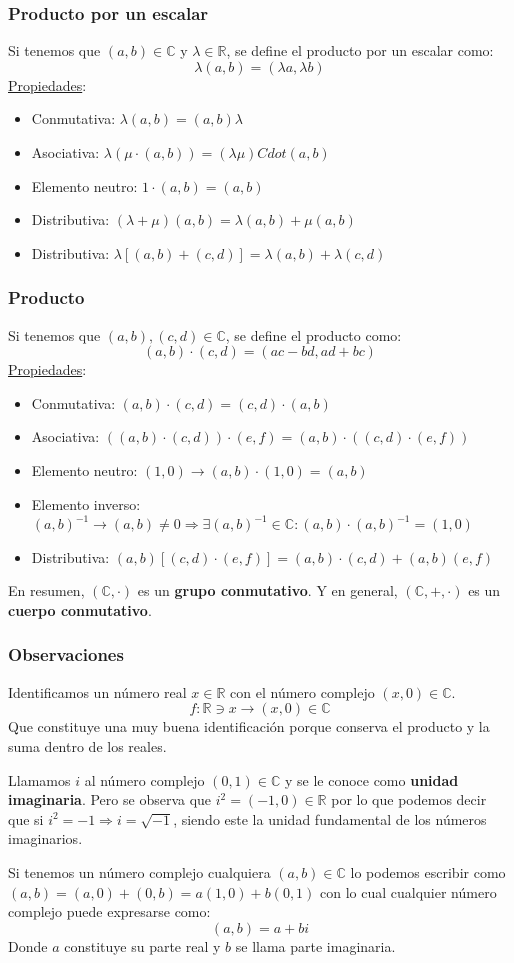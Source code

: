 \documentclass[10pt,a4paper,openright]{book}
\begin{document}
\subsubsection*{Producto por un escalar}
Si tenemos que $(a,b)\in \mathbb C$ y $\lambda\in \mathbb R$, se define el producto por un escalar como:
$$\lambda(a,b)=(\lambda a,\lambda b)$$
\underline{Propiedades}:
\begin{itemize}
\item Conmutativa: $\lambda(a,b)=(a,b)\lambda$
\item Asociativa: $\lambda(\mu \cdot (a,b))=(\lambda\mu)Cdot (a,b)$
\item Elemento neutro: $1\cdot (a,b)=(a,b)$
\item Distributiva: $(\lambda+\mu)(a,b)=\lambda (a,b)+\mu (a,b)$\par
\item Distributiva: $\lambda[(a,b)+(c,d)]=\lambda(a,b)+\lambda(c,d)$
\end{itemize}

\subsubsection*{Producto}
Si tenemos que $(a,b),(c,d)\in \mathbb C$, se define el producto como:
$$(a,b)\cdot (c,d)=(ac-bd,ad+bc)$$
\underline{Propiedades}:
\begin{itemize}
\item Conmutativa: $(a,b)\cdot (c,d)=(c,d)\cdot (a,b)$
\item Asociativa: $\left((a,b)\cdot(c,d)\right)\cdot (e,f)=(a,b)\cdot \left((c,d)\cdot (e,f)\right)$
\item Elemento neutro: $(1,0)\rightarrow (a,b)\cdot (1,0)=(a,b)$
\item Elemento inverso: $(a,b)^{-1}\rightarrow (a,b)\neq 0\Rightarrow \exists (a,b)^{-1}\in \mathbb C: (a,b)\cdot (a,b)^{-1}=(1,0)$
\item Distributiva: $(a,b)[(c,d)\cdot(e,f)]=(a,b)\cdot (c,d)+(a,b)(e,f)$
\end{itemize}
En resumen, $(\mathbb C, \cdot)$ es un \textbf{grupo conmutativo}. Y en general, $(\mathbb C, + ,\cdot)$ es un \textbf{cuerpo conmutativo}.

\subsubsection*{Observaciones}
Identificamos un número real $x\in \mathbb R$ con el número complejo $(x,0)\in \mathbb C$.
$$f: \mathbb R\ni x\rightarrow (x,0)\in \mathbb C$$
Que constituye una muy buena identificación porque conserva el producto y la suma dentro de los reales.\par
Llamamos $i$ al número complejo $(0,1)\in \mathbb C$ y se le conoce como \textbf{unidad imaginaria}. Pero se observa que $i^2=(-1,0)\in \mathbb R$ por lo que podemos decir que si $i^2=-1\Rightarrow i=\sqrt{-1}$, siendo este la unidad fundamental de los números imaginarios.\par
Si tenemos un número complejo cualquiera $(a,b)\in \mathbb C$ lo podemos escribir como $(a,b)=(a,0)+(0,b)=a(1,0)+b(0,1)$ con lo cual cualquier número complejo puede expresarse como:
$$(a,b)=a+bi$$
Donde $a$ constituye su parte real y $b$ se llama parte imaginaria.
\end{document}
